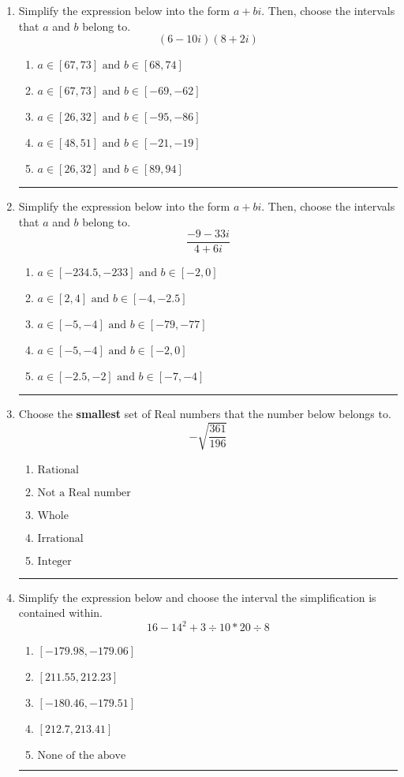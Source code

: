 \documentclass[14pt]{extbook}
\newcommand{\litem}[1]{\item#1\hspace*{-1cm}\rule{\textwidth}{0.4pt}}
\begin{document}
\begin{enumerate}
\litem{
Simplify the expression below into the form $a+bi$. Then, choose the intervals that $a$ and $b$ belong to.\[ (6 - 10 i)(8 + 2 i) \]\begin{enumerate}[label=\Alph*.]
\item \( a \in [67, 73] \text{ and } b \in [68, 74] \)
\item \( a \in [67, 73] \text{ and } b \in [-69, -62] \)
\item \( a \in [26, 32] \text{ and } b \in [-95, -86] \)
\item \( a \in [48, 51] \text{ and } b \in [-21, -19] \)
\item \( a \in [26, 32] \text{ and } b \in [89, 94] \)

\end{enumerate} }
\litem{
Simplify the expression below into the form $a+bi$. Then, choose the intervals that $a$ and $b$ belong to.\[ \frac{-9 - 33 i}{4 + 6 i} \]\begin{enumerate}[label=\Alph*.]
\item \( a \in [-234.5, -233] \text{ and } b \in [-2, 0] \)
\item \( a \in [2, 4] \text{ and } b \in [-4, -2.5] \)
\item \( a \in [-5, -4] \text{ and } b \in [-79, -77] \)
\item \( a \in [-5, -4] \text{ and } b \in [-2, 0] \)
\item \( a \in [-2.5, -2] \text{ and } b \in [-7, -4] \)

\end{enumerate} }
\litem{
Choose the \textbf{smallest} set of Real numbers that the number below belongs to.\[ -\sqrt{\frac{361}{196}} \]\begin{enumerate}[label=\Alph*.]
\item \( \text{Rational} \)
\item \( \text{Not a Real number} \)
\item \( \text{Whole} \)
\item \( \text{Irrational} \)
\item \( \text{Integer} \)

\end{enumerate} }
\litem{
Simplify the expression below and choose the interval the simplification is contained within.\[ 16 - 14^2 + 3 \div 10 * 20 \div 8 \]\begin{enumerate}[label=\Alph*.]
\item \( [-179.98, -179.06] \)
\item \( [211.55, 212.23] \)
\item \( [-180.46, -179.51] \)
\item \( [212.7, 213.41] \)
\item \( \text{None of the above} \)


\end{enumerate}}
\end{enumerate}
\end{document}
